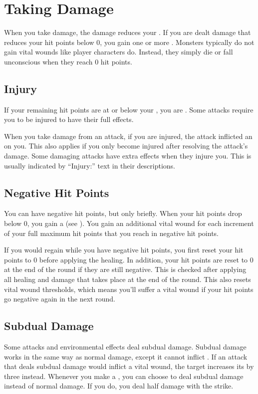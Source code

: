 \section{Taking Damage}\label{Taking Damage}
  When you take damage, the damage reduces your .
  If you are dealt damage that reduces your hit points below 0, you gain one or more .
  Monsters typically do not gain vital wounds like player characters do.
  Instead, they simply die or fall unconscious when they reach 0 hit points.

  \subsection{Injury}\label{Injury}
    If your remaining hit points are at or below your , you are .
    Some attacks require you to be injured to have their full effects.

    When you take damage from an attack, if you are injured, the attack inflicted an  on you.
    This also applies if you only become injured after resolving the attack's damage.
    Some damaging attacks have extra effects when they injure you.
    This is usually indicated by ``Injury:'' text in their descriptions.

  \subsection{Negative Hit Points}\label{Negative Hit Points}
    You can have negative hit points, but only briefly.
    When your hit points drop below 0, you gain a  (see ).
    You gain an additional vital wound for each increment of your full maximum hit points that you reach in negative hit points.

    If you would regain  while you have negative hit points, you first reset your hit points to 0 before applying the healing.
    In addition, your hit points are reset to 0 at the end of the round if they are still negative.
    This is checked after applying all healing and damage that takes place at the end of the round.
    This also resets vital wound thresholds, which means you'll suffer a vital wound if your hit points go negative again in the next round.

  \subsection{Subdual Damage}\label{Subdual Damage}
    Some attacks and environmental effects deal subdual damage.
    Subdual damage works in the same way as normal damage, except it cannot inflict .
    If an attack that deals subdual damage would inflict a vital wound, the target increases its  by three instead.
    Whenever you make a , you can choose to deal subdual damage instead of normal damage.
    If you do, you deal half damage with the strike.

